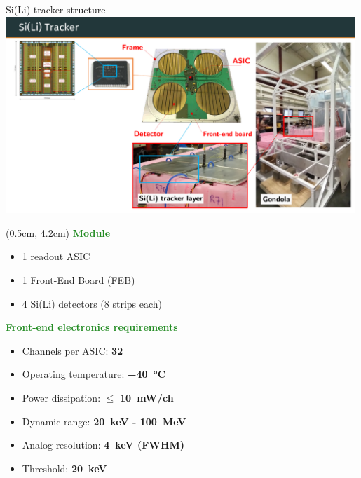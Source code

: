 \documentclass[aspectratio=169,xcolor=dvipsnamesz]{beamer} %
\begin{document}
\begin{frame}{Si(Li) tracker structure}
    \fontsize{9pt}{1}\selectfont
    \addtolength{\leftmargini}{\labelsep}
    \vspace{0.1cm}
    \includegraphics[width=0.99\textwidth]{images/experiment_intro/manghisoni_SIE_ASSEMBLY.pdf}
    \begin{textblock*}{0.35\textwidth}(0.5cm, 4.2cm)
        \textbf{\textcolor{ForestGreen}{Module}}
        \fontsize{8.5pt}{1}\selectfont
        \vspace{0.05cm}
        \begin{itemize}
            \item 1 readout ASIC
            \item 1 Front-End Board (FEB)
            \item 4 Si(Li) detectors (8 strips each)
        \end{itemize}
        \vspace{0.1cm}
        \fontsize{9pt}{1}\selectfont
        \textbf{\textcolor{ForestGreen}{Front-end electronics requirements}}
        \fontsize{8.5pt}{1}\selectfont
        \vspace{0.05cm}
        \begin{itemize}
            \item Channels per ASIC: \textbf{32}
            \item Operating temperature: \textbf{\SI{-40}{\celsius}}
            \item Power dissipation: $\leq$ \textbf{\SI{10}{\milli\watt/ch}}
            \item Dynamic range: \textbf{\SI{20}{\kilo\electronvolt} - \SI{100}{\mega\electronvolt}}
            \item Analog resolution: \textbf{\SI{4}{\kilo\electronvolt} (FWHM)}
            \item Threshold: \textbf{\SI{20}{\kilo\electronvolt}}
        \end{itemize}
    \end{textblock*}
\end{frame}
\end{document}
